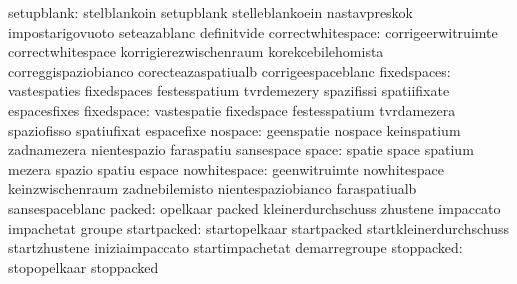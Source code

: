                      setupblank: stelblankoin                     setupblank
                                  stelleblankoein                  nastavpreskok
                                  impostarigovuoto                 seteazablanc
                                  definitvide
               correctwhitespace: corrigeerwitruimte               correctwhitespace
                                  korrigierezwischenraum           korekcebilehomista
                                  correggispaziobianco             corecteazaspatiualb
                                  corrigeespaceblanc
                     fixedspaces: vastespaties                     fixedspaces
                                  festesspatium                    tvrdemezery
                                  spazifissi                       spatiifixate
                                  espacesfixes
                      fixedspace: vastespatie                      fixedspace
                                  festesspatium                    tvrdamezera
                                  spaziofisso                      spatiufixat
                                  espacefixe
                         nospace: geenspatie                       nospace
                                  keinspatium                      zadnamezera
                                  nientespazio                     faraspatiu
                                  sansespace
                           space: spatie                           space
                                  spatium                          mezera
                                  spazio                           spatiu
                                  espace
                    nowhitespace: geenwitruimte                    nowhitespace
                                  keinzwischenraum                 zadnebilemisto
                                  nientespaziobianco               faraspatiualb
                                  sansespaceblanc
                          packed: opelkaar                         packed
                                  kleinerdurchschuss               zhustene
                                  impaccato                        impachetat
                                  groupe
                     startpacked: startopelkaar                    startpacked
                                  startkleinerdurchschuss          startzhustene
                                  iniziaimpaccato                  startimpachetat
                                  demarregroupe
                      stoppacked: stopopelkaar                     stoppacked
